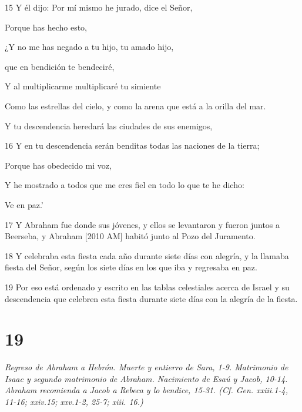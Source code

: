 \par 15 Y él dijo: Por mí mismo he jurado, dice el Señor,
\par    
\par     Porque has hecho esto,  
\par     ¿Y no me has negado a tu hijo, tu amado hijo,  
\par     que en bendición te bendeciré,
\par    
\par     Y al multiplicarme multiplicaré tu simiente  
\par     Como las estrellas del cielo, y como la arena que está a la orilla del mar.
\par    
\par     Y tu descendencia heredará las ciudades de sus enemigos,  
\par    
\par 16 Y en tu descendencia serán benditas todas las naciones de la tierra;
\par    
\par     Porque has obedecido mi voz,  
\par     Y he mostrado a todos que me eres fiel en todo lo que te he dicho:
\par    
\par     Ve en paz.'
\par    
\par 17 Y Abraham fue donde sus jóvenes, y ellos se levantaron y fueron juntos a Beerseba, y Abraham [2010 AM] habitó junto al Pozo del Juramento.
\par 18 Y celebraba esta fiesta cada año durante siete días con alegría, y la llamaba fiesta del Señor, según los siete días en los que iba y regresaba en paz.
\par 19 Por eso está ordenado y escrito en las tablas celestiales acerca de Israel y su descendencia que celebren esta fiesta durante siete días con la alegría de la fiesta.

\chapter{19}

\par \textit{Regreso de Abraham a Hebrón. Muerte y entierro de Sara, 1-9. Matrimonio de Isaac y segundo matrimonio de Abraham. Nacimiento de Esaú y Jacob, 10-14. Abraham recomienda a Jacob a Rebeca y lo bendice, 15-31. (Cf. Gen. xxiii.1-4, 11-16; xxiv.15; xxv.1-2, 25-7; xiii. 16.)}

